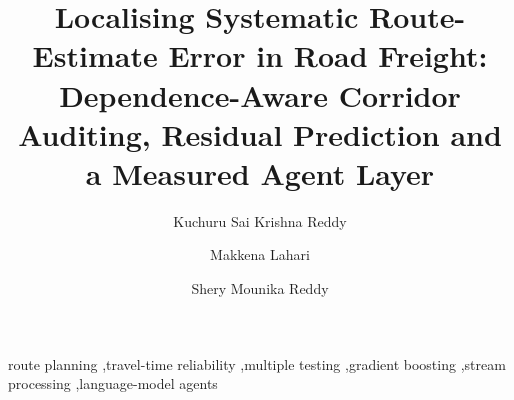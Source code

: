 \documentclass[preprint,10pt]{elsarticle}
\begin{document}
\begin{frontmatter}

\title{Localising Systematic Route-Estimate Error in Road Freight: Dependence-Aware Corridor Auditing, Residual Prediction and a Measured Agent Layer}

\author[nmims]{Kuchuru Sai Krishna Reddy}
\author[nmims]{Makkena Lahari}
\author[nmims]{Shery Mounika Reddy}

\begin{abstract}

\end{abstract}

\begin{keyword}
route planning \sep travel-time reliability \sep multiple testing \sep gradient boosting \sep stream processing \sep language-model agents
\end{keyword}

\end{frontmatter}


















\end{document}

